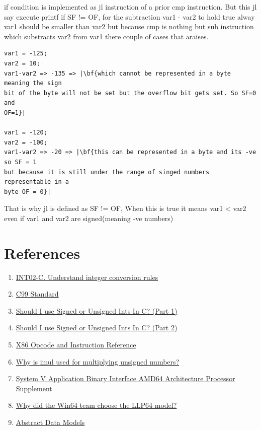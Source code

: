 \documentclass{article}
\begin{document}
if condition is implemented as jl instruction of a prior cmp instruction. But
this jl say execute printf if SF != OF, for the subtraction var1 - var2 to hold
true alway var1 should be smaller than var2 but because cmp is nothing but sub
instruction which substracts var2 from var1 there couple of cases that araises.
\begin{verbatim}
var1 = -125;
var2 = 10;
var1-var2 => -135 => |\bf{which cannot be represented in a byte meaning the sign
bit of the byte will not be set but the overflow bit gets set. So SF=0 and
OF=1}|

var1 = -120;
var2 = -100;
var1-var2 => -20 => |\bf{this can be represented in a byte and its -ve so SF = 1
but because it is still under the range of singed numbers representable in a
byte OF = 0}|
\end{verbatim}
That is why jl is defined as SF != OF, When this is true it means var1 < var2
even if var1 and var2 are signed(meaning -ve numbers)

\section{References}
\begin{enumerate}[noitemsep]
\item \href{https://wiki.sei.cmu.edu/confluence/display/c/INT02-C.+Understand+integer+conversion+rules}{INT02-C. Understand integer conversion rules}
\item \href{http://www.open-std.org/jtc1/sc22/wg14/www/docs/n1256.pdf}{C99 Standard}
\item \href{http://blog.robertelder.org/signed-or-unsigned/}{Should I use Signed or Unsigned Ints In C? (Part 1)}
\item \href{http://blog.robertelder.org/signed-or-unsigned-part-2/}{Should I use Signed or Unsigned Ints In C? (Part 2)}
\item \href{http://ref.x86asm.net/coder-abc.html}{X86 Opcode and Instruction Reference}
\item \href{https://stackoverflow.com/a/42589535/2407966}{Why is imul used for multiplying unsigned numbers?}
\item \href{http://www.unix.org/version2/whatsnew/lp64_wp.html}{System V Application Binary Interface AMD64 Architecture Processor Supplement}
\item \href{https://software.intel.com/sites/default/files/article/402129/mpx-linux64-abi.pdf}{Why did the Win64 team choose the LLP64 model?}
\item \href{https://blogs.msdn.microsoft.com/oldnewthing/20050131-00/?p=36563}{Abstract Data Models}

\end{enumerate}
\end{document}
